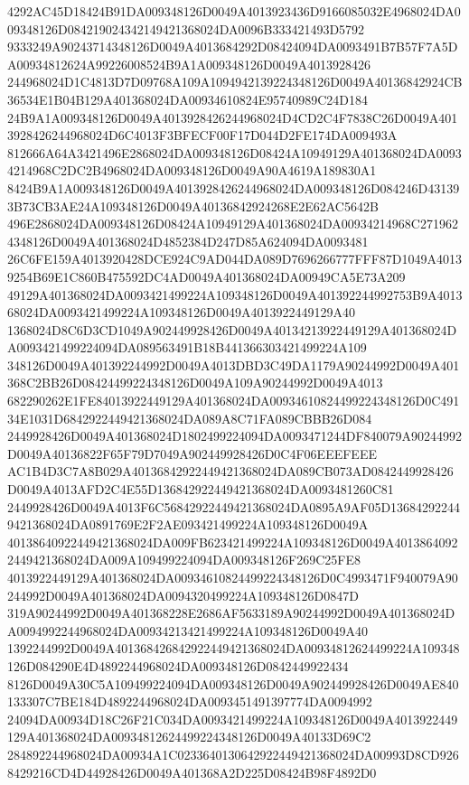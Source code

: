 \documentclass[UTF8,fontset=fandol,zihao=-4,a4paper]{ctexart}
\begin{document}
{{4292AC45D18424B91DA009348126D0049A4013923436D9166085032E4968024DA009348126D084219024342149421368024DA0096B333421493D5792
9333249A90243714348126D0049A4013684292D08424094DA0093491B7B57F7A5DA00934812624A99226008524B9A1A009348126D0049A4013928426
244968024D1C4813D7D09768A109A1094942139224348126D0049A40136842924CB36534E1B04B129A401368024DA00934610824E95740989C24D184
24B9A1A009348126D0049A4013928426244968024D4CD2C4F7838C26D0049A4013928426244968024D6C4013F3BFECF00F17D044D2FE174DA009493A
812666A64A3421496E2868024DA009348126D08424A10949129A401368024DA00934214968C2DC2B4968024DA009348126D0049A90A4619A189830A1
8424B9A1A009348126D0049A4013928426244968024DA009348126D084246D431393B73CB3AE24A109348126D0049A40136842924268E2E62AC5642B
496E2868024DA009348126D08424A10949129A401368024DA00934214968C2719624348126D0049A401368024D4852384D247D85A624094DA0093481
26C6FE159A4013920428DCE924C9AD044DA089D7696266777FFF87D1049A40139254B69E1C860B475592DC4AD0049A401368024DA00949CA5E73A209
49129A401368024DA0093421499224A109348126D0049A401392244992753B9A401368024DA0093421499224A109348126D0049A4013922449129A40
1368024D8C6D3CD1049A902449928426D0049A40134213922449129A401368024DA0093421499224094DA089563491B18B441366303421499224A109
348126D0049A401392244992D0049A4013DBD3C49DA1179A90244992D0049A401368C2BB26D08424499224348126D0049A109A90244992D0049A4013
682290262E1FE84013922449129A401368024DA00934610824499224348126D0C49134E1031D6842922449421368024DA089A8C71FA089CBBB26D084
2449928426D0049A401368024D1802499224094DA0093471244DF840079A90244992D0049A40136822F65F79D7049A902449928426D0C4F06EEEFEEE
AC1B4D3C7A8B029A40136842922449421368024DA089CB073AD0842449928426D0049A4013AFD2C4E55D136842922449421368024DA0093481260C81
2449928426D0049A4013F6C56842922449421368024DA0895A9AF05D136842922449421368024DA0891769E2F2AE093421499224A109348126D0049A
40138640922449421368024DA009FB623421499224A109348126D0049A40138640922449421368024DA009A109499224094DA009348126F269C25FE8
4013922449129A401368024DA00934610824499224348126D0C4993471F940079A90244992D0049A401368024DA0094320499224A109348126D0847D
319A90244992D0049A401368228E2686AF5633189A90244992D0049A401368024DA0094992244968024DA00934213421499224A109348126D0049A40
1392244992D0049A401368426842922449421368024DA00934812624499224A109348126D084290E4D4892244968024DA009348126D0842449922434
8126D0049A30C5A109499224094DA009348126D0049A902449928426D0049AE840133307C7BE184D4892244968024DA0093451491397774DA0094992
24094DA00934D18C26F21C034DA0093421499224A109348126D0049A4013922449129A401368024DA00934812624499224348126D0049A40133D69C2
284892244968024DA00934A1C0233640130642922449421368024DA00993D8CD9268429216CD4D44928426D0049A401368A2D225D08424B98F4892D0
}}
\end{document}

